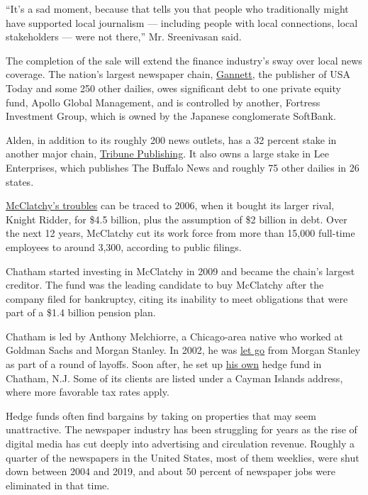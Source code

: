 ``It's a sad moment, because that tells you that people who
traditionally might have supported local journalism --- including people
with local connections, local stakeholders --- were not there,'' Mr.
Sreenivasan said.

The completion of the sale will extend the finance industry's sway over
local news coverage. The nation's largest newspaper chain,
\href{https://www.nytimes.com/2019/11/19/business/media/gannett-gatehouse-merger.html}{Gannett},
the publisher of USA Today and some 250 other dailies, owes significant
debt to one private equity fund, Apollo Global Management, and is
controlled by another, Fortress Investment Group, which is owned by the
Japanese conglomerate SoftBank.

Alden, in addition to its roughly 200 news outlets, has a 32 percent
stake in another major chain,
\href{https://www.nytimes.com/2020/07/02/business/media/tribune-alden-board-seat.html}{Tribune
Publishing}. It also owns a large stake in Lee Enterprises, which
publishes The Buffalo News and roughly 75 other dailies in 26 states.

\href{https://www.nytimes.com/2006/03/13/business/media/newspaper-chain-agrees-to-a-sale-for-45-billion.html}{McClatchy's
troubles} can be traced to 2006, when it bought its larger rival, Knight
Ridder, for \$4.5 billion, plus the assumption of \$2 billion in debt.
Over the next 12 years, McClatchy cut its work force from more than
15,000 full-time employees to around 3,300, according to public filings.

Chatham started investing in McClatchy in 2009 and became the chain's
largest creditor. The fund was the leading candidate to buy McClatchy
after the company filed for bankruptcy, citing its inability to meet
obligations that were part of a \$1.4 billion pension plan.

Chatham is led by Anthony Melchiorre, a Chicago-area native who worked
at Goldman Sachs and Morgan Stanley. In 2002, he was
\href{https://www.fnlondon.com/articles/morgan-stanley-cuts-leveraged-finance-as-bank-cull-hits-2500-20021121}{let
go} from Morgan Stanley as part of a round of layoffs. Soon after, he
set up
\href{https://www.sec.gov/Archives/edgar/data/915802/000091580217000002/redmontprochathamsupplement0.htm}{his
own} hedge fund in Chatham, N.J. Some of its clients are listed under a
Cayman Islands address, where more favorable tax rates apply.

Hedge funds often find bargains by taking on properties that may seem
unattractive. The newspaper industry has been struggling for years as
the rise of digital media has cut deeply into advertising and
circulation revenue. Roughly a quarter of the newspapers in the United
States, most of them weeklies, were shut down between 2004 and 2019, and
about 50 percent of newspaper jobs were eliminated in that time.

